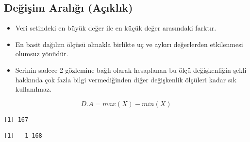 \documentclass[
  letterpaper,
  DIV=11,
  numbers=noendperiod]{scrreprt}
\newenvironment{Shaded}{\begin{snugshade}}{\end{snugshade}}
\newcommand{\AttributeTok}[1]{\textcolor[rgb]{0.40,0.45,0.13}{#1}}
\newcommand{\CommentTok}[1]{\textcolor[rgb]{0.37,0.37,0.37}{#1}}
\newcommand{\ConstantTok}[1]{\textcolor[rgb]{0.56,0.35,0.01}{#1}}
\newcommand{\DecValTok}[1]{\textcolor[rgb]{0.68,0.00,0.00}{#1}}
\newcommand{\FunctionTok}[1]{\textcolor[rgb]{0.28,0.35,0.67}{#1}}
\newcommand{\NormalTok}[1]{\textcolor[rgb]{0.00,0.23,0.31}{#1}}
\newcommand{\SpecialCharTok}[1]{\textcolor[rgb]{0.37,0.37,0.37}{#1}}
\begin{document}
\hypertarget{deux11fiux15fim-aralux131ux11fux131-auxe7ux131klux131k}{%
\subsection*{Değişim Aralığı
(Açıklık)}\label{deux11fiux15fim-aralux131ux11fux131-auxe7ux131klux131k}}

\begin{itemize}
\item
  Veri setindeki en büyük değer ile en küçük değer arasındaki farktır.
\item
  En basit dağılım ölçüsü olmakla birlikte uç ve aykırı değerlerden
  etkilenmesi olumsuz yönüdür.
\item
  Serinin sadece 2 gözlemine bağlı olarak hesaplanan bu ölçü
  değişkenliğin şekli hakkında çok fazla bilgi vermediğinden diğer
  değişkenlik ölçüleri kadar sık kullanılmaz.
\end{itemize}

\[D.A = max(X)-min(X)\]

\begin{Shaded}
\end{Shaded}

\begin{verbatim}
[1] 167
\end{verbatim}

\begin{Shaded}
\end{Shaded}

\begin{verbatim}
[1]   1 168
\end{verbatim}

\begin{Shaded}
\end{Shaded}
\end{document}
